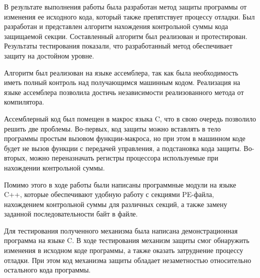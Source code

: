 
В результате выполнения работы была разработан метод защиты программы от
изменения ее исходного кода, который также препятствует процессу отладки.  Был
разработан и представлен алгоритм нахождения контрольной суммы кода защищаемой
секции. Составленный алгоритм был реализован и протестирован.  Результаты
тестирования показали, что разработанный метод обеспечивает защиту на достойном
уровне.

Алгоритм был реализован на языке ассемблера, так как была необходимость иметь
полный контроль над получающимся машинным кодом. Реализация на языке ассемблера
позволила достичь независимости реализованного метода от компилятора.

Ассемблерный код был помещен в макрос языка C, что в свою очередь позволило
решить две проблемы. Во-первых, код защиты можно вставлять в тело программы
простым вызовом функции-макроса, но при этом в машинном коде будет не вызов
функции с передачей управления, а подстановка кода защиты. Во-вторых, можно
переназначать регистры процессора используемые при нахождении контрольной суммы.

Помимо этого в ходе работы были написаны программные модули на языке C++,
которые обеспечивают удобную работу с секциями PE-файла, нахождением контрольной
суммы для различных секций, а также замену заданной последовательности байт в
файле. 

Для тестирования полученного механизма была написана демонстрационная программа
на языке C. В ходе тестирования механизм защиты смог обнаружить изменения в
исходном коде программы, а также оказать затруднение процессу отладки. При этом
код механизма защиты обладает незаметностью относительно остального кода
программы.
